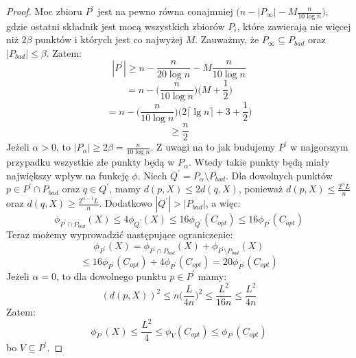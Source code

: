 \begin{proof}
    Moc zbioru $P^{'}$ jest na pewno równa conajmniej $\Big(n - |P_{\infty}| - M\frac{n}{10 \log n} \Big)$, gdzie ostatni składnik jest mocą wszystkich zbiorów $P_{i}$, które zawierają nie więcej niż $2\beta$ punktów i których jest co najwyżej $M$.
    Zauważmy, że $P_{\infty} \subseteq P_{bad}$ oraz $|P_{bad}| \leq \beta$.
    Zatem:
    \begin{equation}
        |P^{'}| \geq n - \frac{n}{20 \log n} - M \frac{n}{10 \log n}
    \end{equation}
    \begin{equation}
        = n - \Big(\frac{n}{10 \log n}\Big) \Big(M + \frac{1}{2}\Big)
    \end{equation}
    \begin{equation}
        = n - \Big(\frac{n}{10 \log n}\Big) \Big(2 \lceil \lg n \rceil + 3 + \frac{1}{2}\Big)
    \end{equation}
    \begin{equation}
        \geq \frac{n}{2}
    \end{equation}
    Jeżeli $\alpha > 0$, to $|P_{\alpha}| \geq 2\beta = \frac{n}{10 \log n}$.
    Z uwagi na to jak budujemy $P^{'}$ w najgorszym przypadku wszystkie złe punkty będą w $P_{\alpha}$.
    Wtedy takie punkty będą miały największy wpływ na funkcję $\phi$.
    Niech $Q^{'} = P_{\alpha} \setminus P_{bad}$.
    Dla dowolnych punktów $p \in P^{'} \cap P_{bad}$ oraz $q \in Q^{'}$, mamy $d(p, X) \leq 2d(q,X)$, ponieważ $d(p, X) \leq \frac{2^{\alpha}L}{n}$ oraz $d(q, X) \geq \frac{2^{\alpha-1}L}{n}$.
    Dodatkowo $|Q^{'}| > |P_{bad}|$, a więc:
    \begin{equation}
        \phi_{P^{'} \cap P_{bad}}(X) \leq 4\phi_{Q^{'}}(X) \leq 16\phi_{Q^{'}}(C_{opt}) \leq 16\phi_{P^{'}}(C_{opt})
    \end{equation}
    Teraz możemy wyprowadzić następujące ograniczenie:
    \begin{equation}
        \phi_{P^{'}}(X) = \phi_{P^{'} \cap P_{bad}}(X) + \phi_{P^{'} \setminus P_{bad}}(X)
    \end{equation}
    \begin{equation}
        \leq 16\phi_{P^{'}}(C_{opt}) + 4\phi_{P^{'}}(C_{opt}) = 20\phi_{P^{'}}(C_{opt})
    \end{equation}
    Jeżeli $\alpha = 0$, to dla dowolnego punktu $p \in P^{'}$ mamy:
    \begin{equation}
        (d(p,X))^2 \leq n\Big(\frac{L}{4n}\Big)^2 \leq \frac{L^{2}}{16n} \leq \frac{L^{2}}{4n}
    \end{equation}
    Zatem:
    \begin{equation}
        \phi_{P^{'}}(X) \leq \frac{L^{2}}{4} \leq \phi_{V}(C_{opt}) \leq \phi_{P^{'}}(C_{opt})
    \end{equation}
    bo $V \subseteq P^{'}$.
\end{proof}

